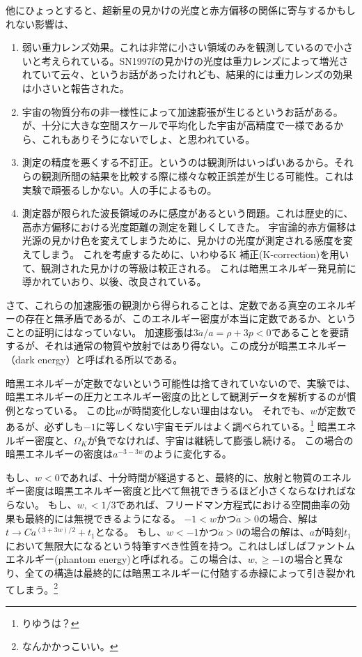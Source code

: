 \documentclass[11pt]{ltjsarticle}
\theoremstyle{plain}
\theoremstyle{break}
\begin{document}
他にひょっとすると、超新星の見かけの光度と赤方偏移の関係に寄与するかもしれない影響は、
\begin{enumerate}
\item 弱い重力レンズ効果。これは非常に小さい領域のみを観測しているので小さいと考えられている。SN1997fの見かけの光度は重力レンズによって増光されていて云々、というお話があったけれども、結果的には重力レンズの効果は小さいと報告された。
\item 宇宙の物質分布の非一様性によって加速膨張が生じるというお話がある。が、十分に大きな空間スケールで平均化した宇宙が高精度で一様であるから、これもありそうにないでしょ、と思われている。
\item 測定の精度を悪くする不訂正。というのは観測所はいっぱいあるから。それらの観測所間の結果を比較する際に様々な較正誤差が生じる可能性。これは実験で頑張るしかない。人の手によるもの。
\item 測定器が限られた波長領域のみに感度があるという問題。これは歴史的に、高赤方偏移における光度距離の測定を難しくしてきた。
宇宙論的赤方偏移は光源の見かけ色を変えてしまうために、見かけの光度が測定される感度を変えてしまう。
これを考慮するために、いわゆるK 補正(K-correction)を用いて、観測された見かけの等級は較正される。
これは暗黒エネルギー発見前に導かれていおり、以後、改良されている。
\end{enumerate}%

さて、これらの加速膨張の観測から得られることは、定数である真空のエネルギーの存在と無矛盾であるが、このエネルギー密度が本当に定数であるか、ということの証明にはなっていない。
加速膨張は$3\ddot{a}/a = \rho + 3 p < 0$であることを要請するが、それは通常の物質や放射ではあり得ない。この成分が暗黒エネルギー（dark energy）と呼ばれる所以である。

暗黒エネルギーが定数でないという可能性は捨てきれていないので、実験では、暗黒エネルギーの圧力とエネルギー密度の比として観測データを解析するのが慣例となっている。
この比$w$が時間変化しない理由はない。
それでも、$w$が定数であるが、必ずしも$-1$に等しくない宇宙モデルはよく調べられている。\footnote{りゆうは？}
暗黒エネルギー密度と、$\Omega_{K}$が負でなければ、宇宙は継続して膨張し続ける。
この場合の暗黒エネルギーの密度は$a^{-3 -3w}$のように変化する。

もし、$w <0$であれば、十分時間が経過すると、最終的に、放射と物質のエネルギー密度は暗黒エネルギー密度と比べて無視できうるほど小さくならなければならない。
もし、$w,<1/3$であれば、フリードマン方程式における空間曲率の効果も最終的には無視できるようになる。
$-1<w$かつ$\dot{a}>0$の場合、解は$t  \to Ca^{(3+3w)/2} + t_1$となる。
もし、$w<-1$かつ$\dot{a}>0$の場合の解は、$a$が時刻$t_1$において無限大になるという特筆すべき性質を持つ。これはしばしばファントムエネルギー(phantom energy)と呼ばれる。この場合は、$w,\geq -1$の場合と異なり、全ての構造は最終的には暗黒エネルギーに付随する赤緑によって引き裂かれてしまう。\footnote{なんかかっこいい。}
\end{document}

